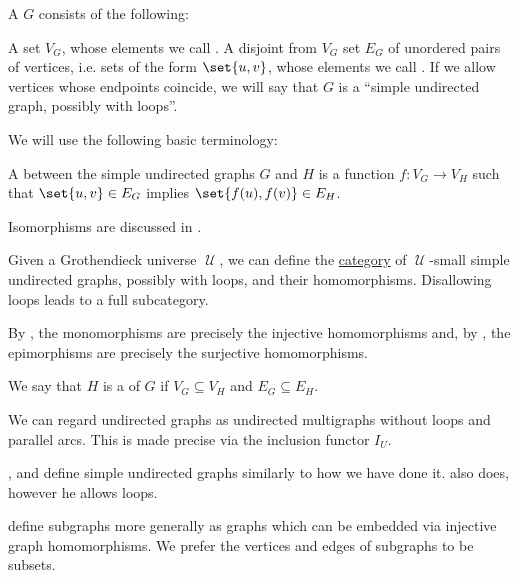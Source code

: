 \begin{definition}\label{def:undirected_graph}
  A  \( G \) consists of the following:
  \begin{thmenum}[series=def:undirected_graph]
     A set \( V_G \), whose elements we call .
     A disjoint from \( V_G \) set \( E_G \) of unordered pairs of  vertices, i.e. sets of the form \( \set{ u, v } \), whose elements we call . If we allow vertices whose endpoints coincide, we will say that \( G \) is a \enquote{simple undirected graph, possibly with loops}.
  \end{thmenum}

  We will use the following basic terminology:
  \begin{thmenum}[resume=def:undirected_graph]
     A  between the simple undirected graphs \( G \) and \( H \) is a function \( f: V_G \to V_H \) such that \( \set{ u, v } \in E_G \) implies \( \set{ f(u), f(v) } \in E_H \).

    Isomorphisms are discussed in .

     Given a Grothendieck universe \( \mscrU \), we can define the \hyperref[def:category]{category} of \( \mscrU \)-small simple undirected graphs, possibly with loops, and their homomorphisms. Disallowing loops leads to a full subcategory.

    By , the monomorphisms are precisely the injective homomorphisms and, by , the epimorphisms are precisely the surjective homomorphisms.

     We say that \( H \) is a  of \( G \) if \( V_G \subseteq V_H \) and \( E_G \subseteq E_H \).
  \end{thmenum}
\end{definition}
\begin{comments}
  \item We can regard undirected graphs as undirected multigraphs without loops and parallel arcs. This is made precise via the inclusion functor \hyperref[def:graph_functors/undirected_inclusion]{\( I_U \)}.

  \item {},  and  define simple undirected graphs similarly to how we have done it.  also does, however he allows loops.

  \item {} define subgraphs more generally as graphs which can be embedded via injective graph homomorphisms. We prefer the vertices and edges of subgraphs to be subsets.
\end{comments}

